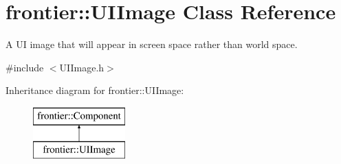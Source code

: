 \hypertarget{classfrontier_1_1_u_i_image}{}\section{frontier\+:\+:U\+I\+Image Class Reference}
\label{classfrontier_1_1_u_i_image}


A UI image that will appear in screen space rather than world space.  




{\ttfamily \#include $<$U\+I\+Image.\+h$>$}

Inheritance diagram for frontier\+:\+:U\+I\+Image\+:\begin{figure}[H]
\begin{center}
\leavevmode
\includegraphics[height=2.000000cm]{classfrontier_1_1_u_i_image}
\end{center}
\end{figure}
